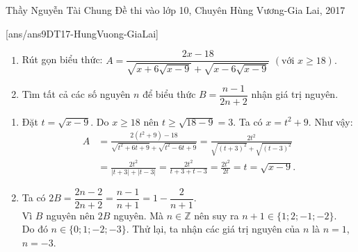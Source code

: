 	\begin{name}
		{Thầy  Nguyễn Tài Chung}
		{Đề thi vào lớp 10, Chuyên Hùng Vương-Gia Lai, 2017}
	\end{name}
	\setcounter{ex}{0}
	[ans/ans9DT17-HungVuong-GiaLai]
	\begin{ex}%
		\hfill
		\begin{enumerate}
			\item Rút gọn biểu thức:
			$A = \dfrac{2x - 18}{\sqrt {x + 6\sqrt {x - 9} }  + \sqrt {x - 6\sqrt {x - 9} }}\,\,\left( {\text{với}\,\,x \ge 18} \right).$
			\item Tìm tất cả các số nguyên $n$ để biểu thức $B=\dfrac{n-1}{2n+2}$ nhận giá trị nguyên.
		\end{enumerate}
		\loigiai
		{
			\begin{enumerate}
				\item Đặt $t = \sqrt {x - 9} $. Do $x\ge 18$ nên $t \ge \sqrt {18 - 9}  = 3$. Ta có $x = {t^2} + 9$. Như vậy:
				{\allowdisplaybreaks
					\begin{align*}
					A &= \frac{{2({t^2} + 9) - 18}}{{\sqrt {{t^2} + 6t + 9}  + \sqrt {{t^2} - 6t + 9} }} = \frac{{2{t^2}}}{{\sqrt {{{(t + 3)}^2}}  + \sqrt {{{(t - 3)}^2}} }}\\
					&= \frac{{2{t^2}}}{{\left| {t + 3} \right| + \left| {t - 3} \right|}} = \frac{{2t^2}}{{t + 3 + t - 3}} = \frac{{2t^2}}{{2t}} =t=\sqrt {x - 9}.
					\end{align*}}
				\item Ta có $2B=\dfrac{2n-2}{2n + 2}=\dfrac{n-1}{n+1}=1-\dfrac{2}{n+1}$.\\
				Vì $B$ nguyên nên $2B$ nguyên. Mà $n\in\mathbb{Z}$ nên suy ra $n+1\in \{ 1; 2; -1; -2 \}$.\\
				Do đó $n\in \{0;1;-2;-3\}$.
				Thử lại, ta nhận các giá trị nguyên của $n$ là $n=1$, $n=-3$.
			\end{enumerate}
		}
	\end{ex}
	
